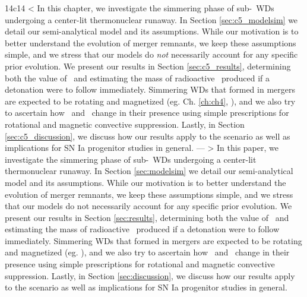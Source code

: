 14c14
< In this chapter, we investigate the simmering phase of sub-\Mch\ WDs undergoing a center-lit thermonuclear runaway.  In Section \ref{sec:c5_modelsim} we detail our semi-analytical model and its assumptions.  While our motivation is to better understand the evolution of merger remnants, we keep these assumptions simple, and we stress that our models do \textit{not} necessarily account for any specific prior evolution.  We present our results in Section \ref{sec:c5_results}, determining both the value of \Mcrit\ and estimating the mass of radioactive \Ni\ produced if a detonation were to follow immediately.  Simmering WDs that formed in mergers are expected to be rotating and magnetized (eg. Ch. \ref{ch:ch4}, \citealt{wicktf14}), and we also try to ascertain how \Mcrit\ and \MNi\ change in their presence using simple prescriptions for rotational and magnetic convective suppression.  Lastly, in Section \ref{sec:c5_discussion}, we discuss how our results apply to the \citeal{vkercj10} scenario as well as implications for SN Ia progenitor studies in general.
---
> In this paper, we investigate the simmering phase of sub-\Mch\ WDs undergoing a center-lit thermonuclear runaway.  In Section \ref{sec:modelsim} we detail our semi-analytical model and its assumptions.  While our motivation is to better understand the evolution of merger remnants, we keep these assumptions simple, and we stress that our models do not necessarily account for any specific prior evolution.  We present our results in Section \ref{sec:results}, determining both the value of \Mcrit\ and estimating the mass of radioactive \Ni\ produced if a detonation were to follow immediately.  Simmering WDs that formed in mergers are expected to be rotating and magnetized (eg. \citealt{wicktf14, zhu+15}), and we also try to ascertain how \Mcrit\ and \MNi\ change in their presence using simple prescriptions for rotational and magnetic convective suppression.  Lastly, in Section \ref{sec:discussion}, we discuss how our results apply to the \citeal{vkercj10} scenario as well as implications for SN Ia progenitor studies in general.

